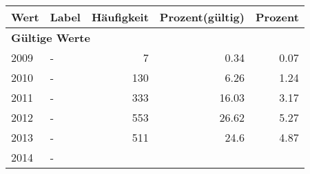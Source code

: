      \begin{longtable}{lXrrr}
     \toprule
     \textbf{Wert} & \textbf{Label} & \textbf{Häufigkeit} & \textbf{Prozent(gültig)} & \textbf{Prozent} \\
     \endhead
     \midrule
     \multicolumn{5}{l}{\textbf{Gültige Werte}}\\

     2009 &
     \multicolumn{1}{X}{ -  } &


       \num{7} &
       \num[round-mode=places,round-precision=2]{0,34} &
         \num[round-mode=places,round-precision=2]{0,07} \\

     2010 &
     \multicolumn{1}{X}{ -  } &


       \num{130} &
       \num[round-mode=places,round-precision=2]{6,26} &
         \num[round-mode=places,round-precision=2]{1,24} \\

     2011 &
     \multicolumn{1}{X}{ -  } &


       \num{333} &
       \num[round-mode=places,round-precision=2]{16,03} &
         \num[round-mode=places,round-precision=2]{3,17} \\

     2012 &
     \multicolumn{1}{X}{ -  } &


       \num{553} &
       \num[round-mode=places,round-precision=2]{26,62} &
         \num[round-mode=places,round-precision=2]{5,27} \\

     2013 &
     \multicolumn{1}{X}{ -  } &


       \num{511} &
       \num[round-mode=places,round-precision=2]{24,6} &
         \num[round-mode=places,round-precision=2]{4,87} \\

     2014 &
     \multicolumn{1}{X}{ -  } &



\end{longtable}
